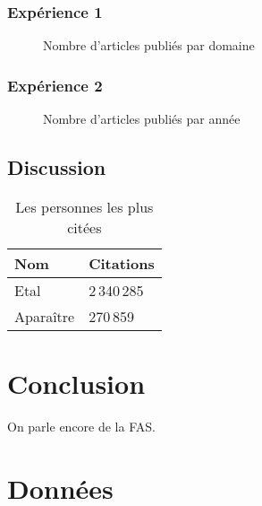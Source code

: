 \documentclass[phd]{dissertum}
\begin{document}
      \subsection{Expérience 1}
        \lipsum[13]
        \begin{figure}
          \centering
          \caption{Nombre d'articles publiés par domaine}
        \end{figure}
      \subsection{Expérience 2}
        \lipsum[14]
        \begin{figure}
          \centering
          \caption{Nombre d'articles publiés par année}
        \end{figure}
    \section{Discussion}
      \lipsum[15-19]
      \begin{table}
        \centering
        \begin{tabular}{ll}
          \toprule
          \bf Nom & \bf Citations \\
          \midrule
          Etal & 2\,340\,285 \\
          Aparaître & 270\,859 \\ 
          \bottomrule
        \end{tabular}
        \caption{Les personnes les plus citées}
      \end{table}

  \chapter{Conclusion}
    On parle encore de la \ac{FAS}.
    \lipsum[7-10]

  
  
  
  
  \appendix
  \chapter{Données}
    \lipsum[11-20]
\end{document}
